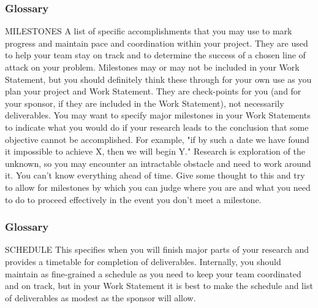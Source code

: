 \begin{frame}
    \frametitle{Glossary}
\begin{block}
        {MILESTONES} A list of specific accomplishments that you may use to mark
progress and maintain pace and coordination within your project. They are used
to help your team stay on track and to determine the success of a chosen line
of attack on your problem. Milestones may or may not be included in your Work
Statement, but you should definitely think these through for your own use as
you plan your project and Work Statement. They are check-points for you (and
for your sponsor, if they are included in the Work Statement), not necessarily
deliverables. You may want to specify major milestones in your Work Statements
to indicate what you would do if your research leads 
to the conclusion that some objective cannot be accomplished. For example, "if
by such a date we have found it impossible to achieve X, then we will begin
Y." Research is exploration of the unknown, so you may encounter an
intractable obstacle and need to work around it. You can't know everything
ahead of time. Give some thought to this and try to allow for milestones by
which you can judge where you are and what you need to do to proceed
effectively in the event you don't meet a milestone.
\end{block}
    
\end{frame}

\begin{frame}
    \frametitle{Glossary}
\begin{block}
        {SCHEDULE} This specifies when you will finish major parts of your research and
provides a timetable for completion of deliverables. Internally, you should
maintain as fine-grained a schedule as you need to keep your team coordinated
and on track, but in your Work Statement it is best to make the schedule and
list of deliverables as modest as the sponsor will allow.
\end{block}
    
\end{frame}

